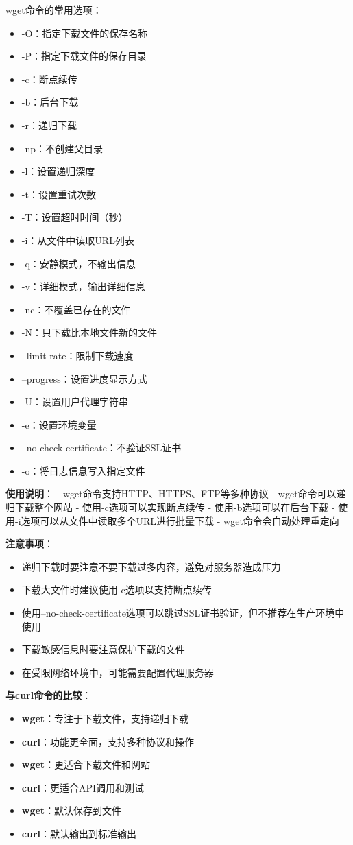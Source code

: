 \documentclass[12pt,UTF8]{ctexbook}
\begin{document}
wget命令的常用选项：
\begin{itemize}
    \item -O：指定下载文件的保存名称
    \item -P：指定下载文件的保存目录
    \item -c：断点续传
    \item -b：后台下载
    \item -r：递归下载
    \item -np：不创建父目录
    \item -l：设置递归深度
    \item -t：设置重试次数
    \item -T：设置超时时间（秒）
    \item -i：从文件中读取URL列表
    \item -q：安静模式，不输出信息
    \item -v：详细模式，输出详细信息
    \item -nc：不覆盖已存在的文件
    \item -N：只下载比本地文件新的文件
    \item --limit-rate：限制下载速度
    \item --progress：设置进度显示方式
    \item -U：设置用户代理字符串
    \item -e：设置环境变量
    \item --no-check-certificate：不验证SSL证书
    \item -o：将日志信息写入指定文件
\end{itemize}

\textbf{使用说明}：
- wget命令支持HTTP、HTTPS、FTP等多种协议
- wget命令可以递归下载整个网站
- 使用-c选项可以实现断点续传
- 使用-b选项可以在后台下载
- 使用-i选项可以从文件中读取多个URL进行批量下载
- wget命令会自动处理重定向

\textbf{注意事项}：
\begin{itemize}
    \item 递归下载时要注意不要下载过多内容，避免对服务器造成压力
    \item 下载大文件时建议使用-c选项以支持断点续传
    \item 使用--no-check-certificate选项可以跳过SSL证书验证，但不推荐在生产环境中使用
    \item 下载敏感信息时要注意保护下载的文件
    \item 在受限网络环境中，可能需要配置代理服务器
\end{itemize}

\textbf{与curl命令的比较}：
\begin{itemize}
    \item \textbf{wget}：专注于下载文件，支持递归下载
    \item \textbf{curl}：功能更全面，支持多种协议和操作
    \item \textbf{wget}：更适合下载文件和网站
    \item \textbf{curl}：更适合API调用和测试
    \item \textbf{wget}：默认保存到文件
    \item \textbf{curl}：默认输出到标准输出
\end{itemize}
\end{document}
